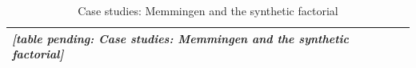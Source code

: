 \begin{table}[t]
\centering
\caption{Case studies: Memmingen and the synthetic factorial}
\label{tab:cases}
\begin{tabular}{l}
\hline
\textit{[table pending: Case studies: Memmingen and the synthetic factorial]} \\
\hline
\end{tabular}
\end{table}
